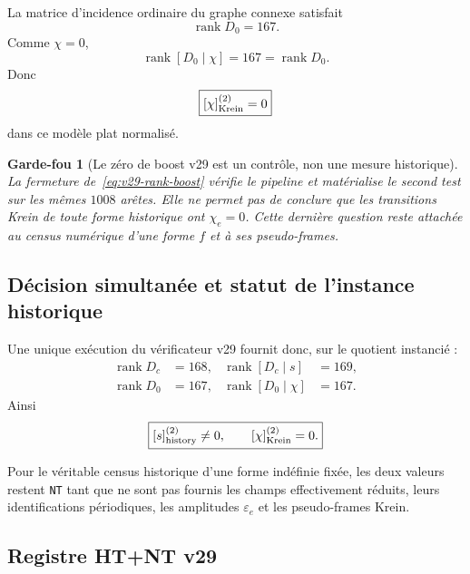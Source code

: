 \documentclass[11pt,a4paper]{article}
\newtheorem{guardrail}[theorem]{Garde-fou}
\newcommand{\rank}{\operatorname{rank}}
\newcommand{\certNT}{\texttt{NT}}
\begin{document}
La matrice d'incidence ordinaire du graphe connexe satisfait
\[
 \boxed{
 \rank D_0=167.}
\]
Comme $\chi=0$,
\begin{equation}\label{eq:v29-rank-boost}
 \boxed{
 \rank[D_0\mid\chi]
 =
 167
 =
 \rank D_0.}
\end{equation}
Donc
\[
 \boxed{
 [\chi]_{\rm Krein}^{(2)}=0}
\]
dans ce modèle plat normalisé.

\begin{guardrail}[Le zéro de boost v29 est un contrôle, non une mesure historique]
La fermeture de~\eqref{eq:v29-rank-boost} vérifie le pipeline et matérialise le second test sur les mêmes $1008$ arêtes. Elle ne permet pas de conclure que les transitions Krein de toute forme historique ont $\chi_e=0$. Cette dernière question reste attachée au census numérique d'une forme $f$ et à ses pseudo-frames.
\end{guardrail}

\subsection{Décision simultanée et statut de l'instance historique}

Une unique exécution du vérificateur v29 fournit donc, sur le quotient instancié :
\begin{equation}\label{eq:v29-double-decision}
 \boxed{
 \begin{aligned}
 \rank D_c&=168,
 &
 \rank[D_c\mid s]&=169,
 \\
 \rank D_0&=167,
 &
 \rank[D_0\mid\chi]&=167.
 \end{aligned}}
\end{equation}
Ainsi
\[
 \boxed{
 [s]_{\rm history}^{(2)}\neq0,
 \qquad
 [\chi]_{\rm Krein}^{(2)}=0.}
\]

Pour le véritable census historique d'une forme indéfinie fixée, les deux valeurs restent \certNT{} tant que ne sont pas fournis les champs effectivement réduits, leurs identifications périodiques, les amplitudes $\varepsilon_e$ et les pseudo-frames Krein.

\subsection{Registre HT+NT v29}
\end{document}
